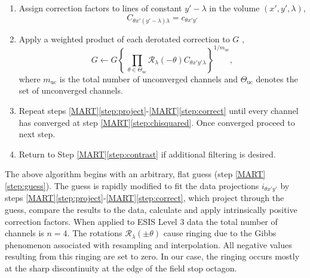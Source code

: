 \documentclass[linenumbers,trackchanges]{aastex63}
\begin{document}
\begin{enumerate}
	\item Assign correction factors to lines of constant $y'-\lambda$ in the volume $(x',y',\lambda)$,
	\begin{equation}
	C_{\theta x'(y'-\lambda)\lambda} = c_{\theta x'y'}
	\end{equation}	
	\item \label{step:correct} Apply a weighted product of each derotated correction to $G$ ,
	\begin{equation}\label{eq:correct}
	G \leftarrow G\left\lbrace  \,\prod_{\theta\in\Theta_{\mathrm{uc}}}  \mathcal{R}_\lambda(-\theta)C_{\theta x'y'\lambda} \right\rbrace^{1/m_{\mathrm{uc}}},
	\end{equation}
	where $m_{\mathrm{uc}}$ is the total number of unconverged channels and $\Theta_{\mathrm{uc}}$ denotes the set of unconverged channels.
	
	\item Repeat steps \ref{MART}\ref{step:project}-\ref{MART}\ref{step:correct}
	until every channel has converged at step \ref{MART}\ref{step:chisquared}. Once converged proceed to next step.
	\item Return to Step \ref{MART}\ref{step:contrast} if additional filtering is desired.
\end{enumerate}
The above algorithm begins with an arbitrary, flat guess (step \ref{MART}\ref{step:guess}). The guess is rapidly modified to fit the data projections $i_{\theta x' y'}$ by steps \ref{MART}\ref{step:project}-\ref{MART}\ref{step:correct}, which project through the guess, compare the results to the data, calculate and apply intrinsically positive correction factors. 
When applied to  ESIS Level 3 data the total number of channels is $n = 4$. 
The rotations $\mathcal{R}_{\lambda}(\pm{\theta})$ cause ringing due to the Gibbs phenomenon associated with resampling and interpolation. 
All negative values resulting from this ringing are set to zero.
In our case, the ringing occurs mostly at the sharp discontinuity at the edge of the field stop octagon. 
\end{document}
